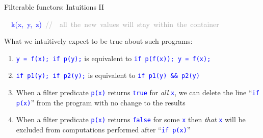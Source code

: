 \documentclass[english]{beamer}
\newenvironment{lyxcode}
   {\par\begin{list}{}{
     \setlength{\rightmargin}{\leftmargin}
     \setlength{\listparindent}{0pt}%
     \raggedright
     \setlength{\itemsep}{0pt}
     \setlength{\parsep}{0pt}
     \normalfont\ttfamily}%
    \def\{{\char`\{}
    \def\}{\char`\}}
    \def\textasciitilde{\char`\~}
    \item[]}
   {\end{list}}
\begin{document}
\begin{frame}{Filterable functors: Intuitions II}
\begin{itemize}
\begin{lyxcode}
\textcolor{blue}{\footnotesize{}~~k(x,~y,~z)~}\textrm{\textcolor{darkgray}{\footnotesize{}//~~all~the~new~values~will~stay~within~the~container}}{\footnotesize \par}
\end{lyxcode}
\item What we intuitively expect to be true about such programs:
\begin{enumerate}
\item \texttt{\textcolor{blue}{\footnotesize{}y = f(x); if p(y);}} is equivalent
to \texttt{\textcolor{blue}{\footnotesize{}if p(f(x)); y = f(x);}} 
\item \texttt{\textcolor{blue}{\footnotesize{}if p1(y); if p2(y);}} is equivalent
to \texttt{\textcolor{blue}{\footnotesize{}if p1(y) \&\& p2(y)}} 
\item When a filter predicate \texttt{\textcolor{blue}{\footnotesize{}p(x)}}
returns \texttt{\textcolor{blue}{\footnotesize{}true}} for \emph{all}
\texttt{\textcolor{blue}{\footnotesize{}x}}, we can delete the line
``\texttt{\textcolor{blue}{\footnotesize{}if p(x)}}'' from the program
with no change to the results
\item When a filter predicate \texttt{\textcolor{blue}{\footnotesize{}p(x)}}
returns \texttt{\textcolor{blue}{\footnotesize{}false}} for some \texttt{\textcolor{blue}{\footnotesize{}x}}
then\emph{ that} \texttt{\textcolor{blue}{\footnotesize{}x}} will
be excluded from computations performed after ``\texttt{\textcolor{blue}{\footnotesize{}if
p(x)}}''
\end{enumerate}
\end{itemize}
\end{frame}
\end{document}
